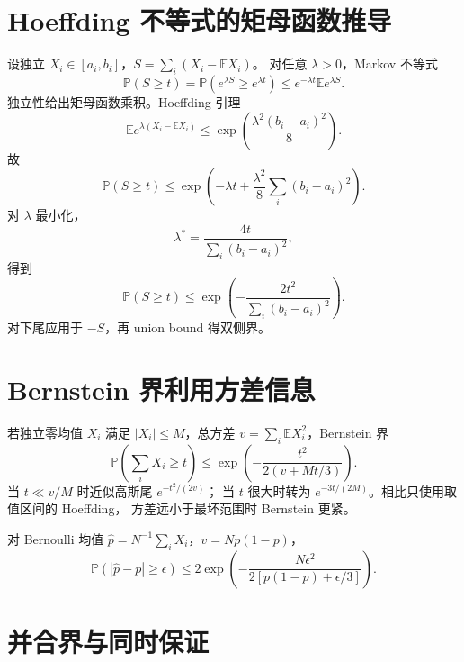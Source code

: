 \documentclass[11pt]{article}
\numberwithin{equation}{section}
\newcommand{\E}{\mathbb{E}}
\newcommand{\Pp}{\mathbb{P}}
\newcommand{\1}{\mathbf{1}}
\begin{document}
\section{Hoeffding 不等式的矩母函数推导}

设独立 $X_i\in[a_i,b_i]$，$S=\sum_i(X_i-\E X_i)$。
对任意 $\lambda>0$，Markov 不等式
\begin{equation}
 \Pp(S\ge t)=\Pp(e^{\lambda S}\ge e^{\lambda t})
 \le e^{-\lambda t}\E e^{\lambda S}.
\end{equation}
独立性给出矩母函数乘积。Hoeffding 引理
\begin{equation}
 \E e^{\lambda(X_i-\E X_i)}
 \le\exp\left(\frac{\lambda^2(b_i-a_i)^2}{8}\right).
\end{equation}
故
\begin{equation}
 \Pp(S\ge t)
 \le\exp\left(-\lambda t+\frac{\lambda^2}{8}
 \sum_i(b_i-a_i)^2\right).
\end{equation}
对 $\lambda$ 最小化，
\begin{equation}
 \lambda^*=\frac{4t}{\sum_i(b_i-a_i)^2},
\end{equation}
得到
\begin{equation}
 \Pp(S\ge t)
 \le\exp\left(-\frac{2t^2}{\sum_i(b_i-a_i)^2}\right).
\end{equation}
对下尾应用于 $-S$，再 union bound 得双侧界。

\section{Bernstein 界利用方差信息}

若独立零均值 $X_i$ 满足 $|X_i|\le M$，总方差
$v=\sum_i\E X_i^2$，Bernstein 界
\begin{equation}
 \Pp\left(\sum_iX_i\ge t\right)
 \le\exp\left(-\frac{t^2}{2(v+Mt/3)}\right).
\end{equation}
当 $t\ll v/M$ 时近似高斯尾 $e^{-t^2/(2v)}$；
当 $t$ 很大时转为 $e^{-3t/(2M)}$。相比只使用取值区间的 Hoeffding，
方差远小于最坏范围时 Bernstein 更紧。

对 Bernoulli 均值 $\widehat p=N^{-1}\sum_iX_i$，$v=Np(1-p)$，
\begin{equation}
 \Pp(|\widehat p-p|\ge\epsilon)
 \le2\exp\left(-\frac{N\epsilon^2}
 {2[p(1-p)+\epsilon/3]}\right).
\end{equation}

\section{并合界与同时保证}
\end{document}
